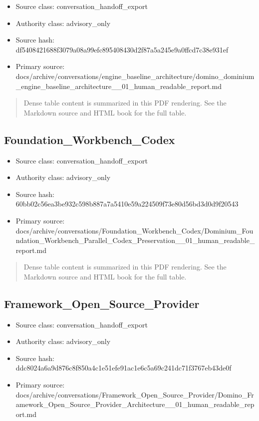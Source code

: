 \documentclass[11pt,a4paper]{report}
\begin{document}
\begin{itemize}
\item Source class: conversation\_handoff\_export
\item Authority class: advisory\_only
\item Source hash: df5408421688f3079a08a99efc895408430d2f87a5a245e9a0ffcd7c38e931ef
\item Primary source: docs/archive/conversations/engine\_baseline\_architecture/domino\_dominium\_engine\_baseline\_architecture\_\_01\_human\_readable\_report.md
\end{itemize}

\begin{quote}\small Dense table content is summarized in this PDF rendering. See the Markdown source and HTML book for the full table.\end{quote}

\subsection{Foundation\_Workbench\_Codex}

\begin{itemize}
\item Source class: conversation\_handoff\_export
\item Authority class: advisory\_only
\item Source hash: 60bb02c56ea3be932c598b887a7a5410e59a224509f73e80d56bd3d0d9f20543
\item Primary source: docs/archive/conversations/Foundation\_Workbench\_Codex/Dominium\_Foundation\_Workbench\_Parallel\_Codex\_Preservation\_\_01\_human\_readable\_report.md
\end{itemize}

\begin{quote}\small Dense table content is summarized in this PDF rendering. See the Markdown source and HTML book for the full table.\end{quote}

\subsection{Framework\_Open\_Source\_Provider}

\begin{itemize}
\item Source class: conversation\_handoff\_export
\item Authority class: advisory\_only
\item Source hash: ddc8024a6a9d876c8f850a4c1e51efe91ac1e6c5a69c241dc71f3767eb43de0f
\item Primary source: docs/archive/conversations/Framework\_Open\_Source\_Provider/Domino\_Framework\_Open\_Source\_Provider\_Architecture\_\_01\_human\_readable\_report.md
\end{itemize}
\end{document}

